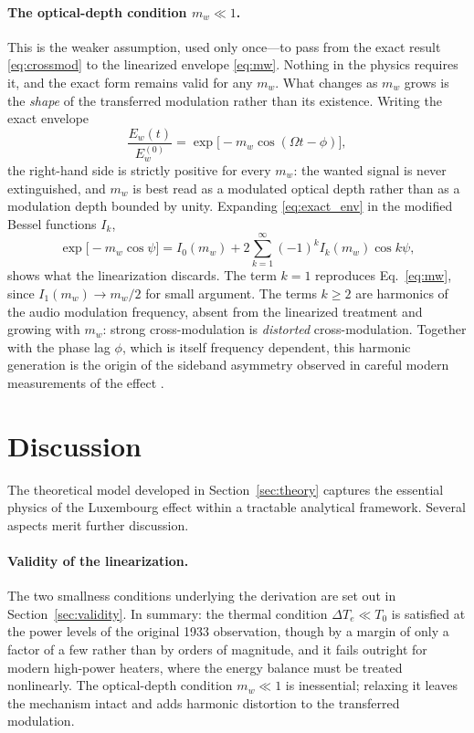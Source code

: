 \documentclass[12pt]{article}
\begin{document}
\paragraph{The optical-depth condition $m_w \ll 1$.}
This is the weaker assumption, used only once---to pass from the exact result
\eqref{eq:crossmod} to the linearized envelope \eqref{eq:mw}.  Nothing in the physics
requires it, and the exact form remains valid for any $m_w$.  What changes as $m_w$ grows
is the \emph{shape} of the transferred modulation rather than its existence.  Writing the
exact envelope
\begin{equation}
  \frac{E_w(t)}{E_w^{(0)}} = \exp\bigl[-m_w\cos(\Omega t - \phi)\bigr],
  \label{eq:exact_env}
\end{equation}
the right-hand side is strictly positive for every $m_w$: the wanted signal is never
extinguished, and $m_w$ is best read as a modulated optical depth rather than as a
modulation depth bounded by unity.  Expanding \eqref{eq:exact_env} in the modified Bessel
functions $I_k$,
\begin{equation}
  \exp\bigl[-m_w\cos\psi\bigr]
    = I_0(m_w) + 2\sum_{k=1}^{\infty} (-1)^k I_k(m_w)\cos k\psi ,
  \label{eq:bessel}
\end{equation}
shows what the linearization discards.  The term $k=1$ reproduces Eq.~\eqref{eq:mw}, since
$I_1(m_w) \to m_w/2$ for small argument.  The terms $k \ge 2$ are harmonics of the audio
modulation frequency, absent from the linearized treatment and growing with $m_w$: strong
cross-modulation is \emph{distorted} cross-modulation.  Together with the phase lag $\phi$,
which is itself frequency dependent, this harmonic generation is the origin of the sideband
asymmetry observed in careful modern measurements of the effect \cite{boer2018}.

\section{Discussion}
\label{sec:discussion}

The theoretical model developed in Section~\ref{sec:theory} captures the essential physics
of the Luxembourg effect within a tractable analytical framework.  Several aspects merit
further discussion.

\paragraph{Validity of the linearization.}
The two smallness conditions underlying the derivation are set out in
Section~\ref{sec:validity}.  In summary: the thermal condition $\Delta T_e \ll T_0$ is
satisfied at the power levels of the original 1933 observation, though by a margin of only a
factor of a few rather than by orders of magnitude, and it fails outright for modern
high-power heaters, where the energy balance must be treated nonlinearly.  The optical-depth
condition $m_w \ll 1$ is inessential; relaxing it leaves the mechanism intact and adds
harmonic distortion to the transferred modulation.
\end{document}
